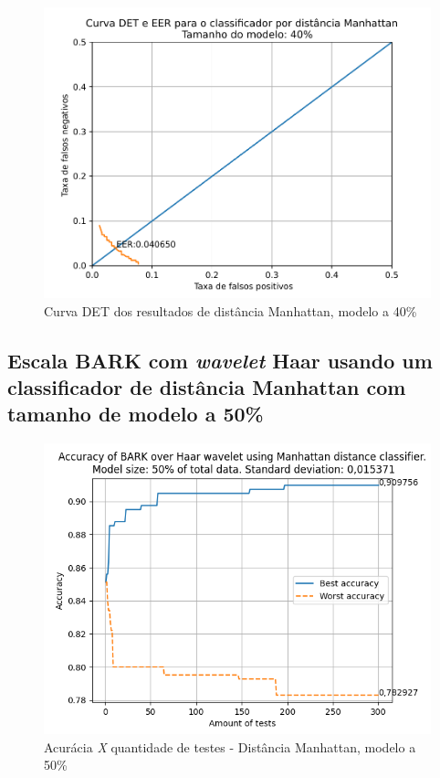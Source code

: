 			\begin{figure}[ht]
				\centering
				\includegraphics[width=\linewidth]{images/results/det/DET_for_classifier_Manhattan_40}
				\caption{Curva DET dos resultados de distância Manhattan, modelo a 40\%}
				\label{fig:detforclassifiermanhattan40}
			\end{figure}
		
			\forceNewPage
		\subsection{Escala BARK com \textit{wavelet} Haar usando um classificador de distância Manhattan com tamanho de modelo a 50\%}
		
			
			
			\begin{figure}[ht]
				\centering
				\includegraphics[width=\linewidth]{images/results/confusionMatrices/classifier_Manhattan_50.png}
				\caption{Acurácia \textit{X} quantidade de testes - Distância Manhattan, modelo a 50\%}
				\label{fig:classifiermanhattan50}
			\end{figure}
	
